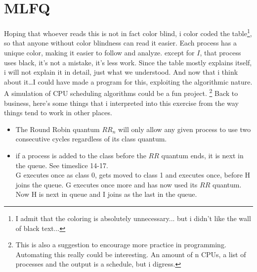 \documentclass[a4paper, 11pt]{article}
\begin{document}
    \section{MLFQ}
    Hoping that whoever reads this is not in fact color blind, i color coded the table\footnote{I admit that the coloring is absolutely unnecessary... but i didn't like the wall of black text...}, so that anyone without color blindness can read it easier.
    Each process has a unique color, making it easier to follow and analyze. except for $I$, that process uses black, it's not a mistake, it's less work.
    Since the table mostly explains itself, i will not explain it in detail, just what we understood. And now that i think about it\dots I could have made a program for this, exploiting the algorithmic nature. A simulation of CPU scheduling algorithms could be a fun project.
    \footnote{This is also a suggestion to encourage more practice in programming. Automating this really could be interesting. An amount of n CPUs, a list of processes and the output is a schedule, but i digress.}
    Back to business, here's some things that i interpreted into this exercise from the way things tend to work in other places.
    \begin{itemize}
      \item The Round Robin quantum $RR_n$ will only allow any given process to use two consecutive cycles regardless of its class quantum.
      \item if a process is added to the class before the $RR$ quantum ends, it is next in the queue. See timeslice 14-17. \\
            G executes once as class 0, gets moved to class 1 and executes once, before H joins the queue. G executes once more and has now used its $RR$ quantum.
            Now H is next in queue and I joins as the last in the queue.
    \end{itemize}
\end{document}
